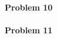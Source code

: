 \documentclass[12pt,a4paper]{article}
\begin{document}
\paragraph{Problem 10}
\paragraph{Problem 11}    
\end{document}
